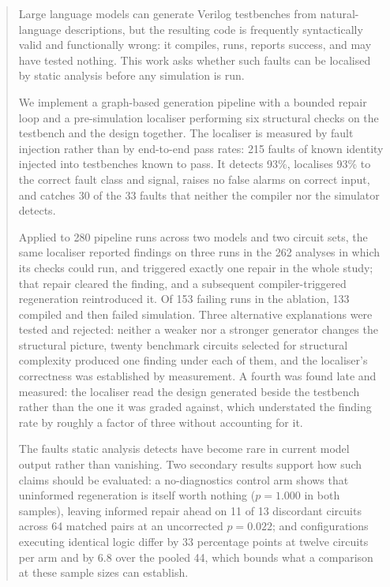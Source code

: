 \documentclass[11pt,a4paper,titlepage=false]{scrreprt}
\begin{document}
\begin{abstract}
\noindent
Large language models can generate Verilog testbenches from natural-language descriptions,
but the resulting code is frequently syntactically valid and functionally wrong: it
compiles, runs, reports success, and may have tested nothing. This work asks whether such
faults can be localised by static analysis before any simulation is run.

We implement a graph-based generation pipeline with a bounded repair loop and a
pre-simulation localiser performing six structural checks on the testbench and the design
together. The localiser is measured by fault injection rather than by end-to-end pass rates:
215 faults of known identity injected into testbenches known to pass. It detects 93\%,
localises 93\% to the correct fault class and signal, raises no false alarms on correct
input, and catches 30 of the 33 faults that neither the compiler nor the simulator detects.

Applied to 280 pipeline runs across two models and two circuit sets, the same localiser
reported findings on three runs in the 262 analyses in which its checks could run, and
triggered exactly one repair in the whole study; that repair cleared the finding, and a
subsequent compiler-triggered regeneration reintroduced it. Of
153 failing runs in the ablation, 133 compiled and then failed simulation.
Three alternative explanations were tested and rejected: neither a weaker nor a stronger
generator changes the structural picture, twenty benchmark circuits selected for structural
complexity produced one finding under each of them, and the localiser's correctness was
established by measurement. A fourth was found late and measured: the localiser read the
design generated beside the testbench rather than the one it was graded against, which
understated the finding rate by roughly a factor of three without accounting for it.

The faults static analysis detects have become rare in current model output rather than
vanishing.
Two secondary results support how such claims should be evaluated: a no-diagnostics control
arm shows that uninformed regeneration is itself worth nothing ($p=1.000$ in both samples),
leaving informed repair ahead on 11 of 13 discordant circuits across 64 matched pairs at an
uncorrected $p=0.022$; and
configurations executing identical logic differ by 33 percentage points at twelve circuits
per arm and by 6.8 over the pooled 44, which bounds what a comparison at these sample sizes
can establish.
\end{abstract}
\end{document}
